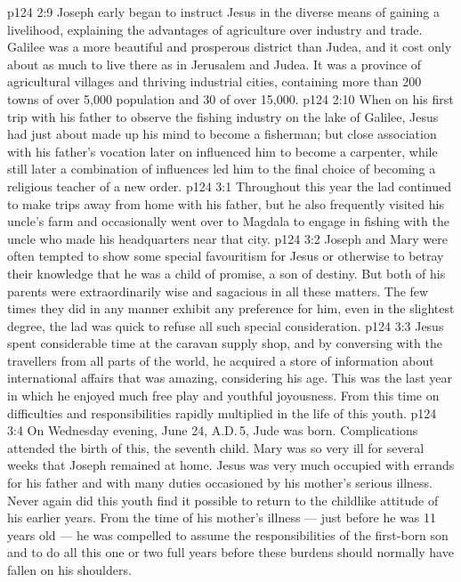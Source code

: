 \vs p124 2:9 Joseph early began to instruct Jesus in the diverse means of gaining a livelihood, explaining the advantages of agriculture over industry and trade. Galilee was a more beautiful and prosperous district than Judea, and it cost only about  as much to live there as in Jerusalem and Judea. It was a province of agricultural villages and thriving industrial cities, containing more than 200 towns of over 5,000 population and 30 of over 15,000.
\vs p124 2:10 When on his first trip with his father to observe the fishing industry on the lake of Galilee, Jesus had just about made up his mind to become a fisherman; but close association with his father’s vocation later on influenced him to become a carpenter, while still later a combination of influences led him to the final choice of becoming a religious teacher of a new order.
\vs p124 3:1 Throughout this year the lad continued to make trips away from home with his father, but he also frequently visited his uncle’s farm and occasionally went over to Magdala to engage in fishing with the uncle who made his headquarters near that city.
\vs p124 3:2 Joseph and Mary were often tempted to show some special favouritism for Jesus or otherwise to betray their knowledge that he was a child of promise, a son of destiny. But both of his parents were extraordinarily wise and sagacious in all these matters. The few times they did in any manner exhibit any preference for him, even in the slightest degree, the lad was quick to refuse all such special consideration.
\vs p124 3:3 Jesus spent considerable time at the caravan supply shop, and by conversing with the travellers from all parts of the world, he acquired a store of information about international affairs that was amazing, considering his age. This was the last year in which he enjoyed much free play and youthful joyousness. From this time on difficulties and responsibilities rapidly multiplied in the life of this youth.
\vs p124 3:4 \pc On Wednesday evening, June 24, A.D.\,5, Jude was born. Complications attended the birth of this, the seventh child. Mary was so very ill for several weeks that Joseph remained at home. Jesus was very much occupied with errands for his father and with many duties occasioned by his mother’s serious illness. Never again did this youth find it possible to return to the childlike attitude of his earlier years. From the time of his mother’s illness --- just before he was 11 years old --- he was compelled to assume the responsibilities of the first\hyp{}born son and to do all this one or two full years before these burdens should normally have fallen on his shoulders.
